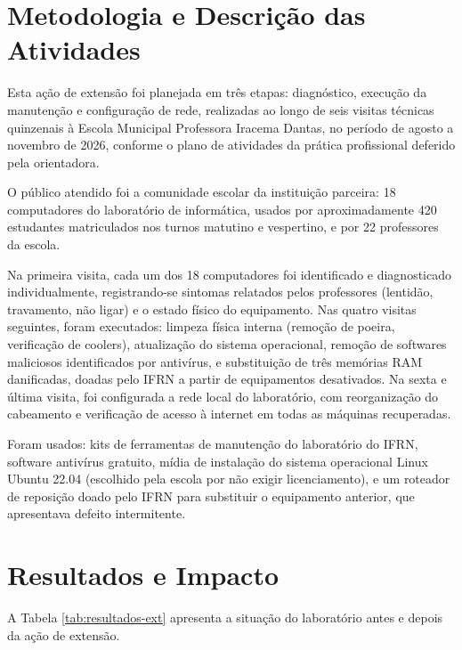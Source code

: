 \documentclass[article,12pt,a4paper,oneside]{abntex2}
\begin{document}
\section{Metodologia e Descrição das Atividades}

Esta ação de extensão foi planejada em três etapas: diagnóstico,
execução da manutenção e configuração de rede, realizadas ao longo de seis
visitas técnicas quinzenais à Escola Municipal Professora Iracema Dantas,
no período de agosto a novembro de 2026, conforme o plano de atividades da
prática profissional deferido pela orientadora.

O público atendido foi a comunidade escolar da instituição parceira: 18
computadores do laboratório de informática, usados por aproximadamente 420
estudantes matriculados nos turnos matutino e vespertino, e por 22
professores da escola.

Na primeira visita, cada um dos 18 computadores foi identificado e
diagnosticado individualmente, registrando-se sintomas relatados pelos
professores (lentidão, travamento, não ligar) e o estado físico do
equipamento. Nas quatro visitas seguintes, foram executados: limpeza
física interna (remoção de poeira, verificação de coolers), atualização
do sistema operacional, remoção de softwares maliciosos identificados por
antivírus, e substituição de três memórias RAM danificadas, doadas pelo
IFRN a partir de equipamentos desativados. Na sexta e última visita, foi
configurada a rede local do laboratório, com reorganização do cabeamento
e verificação de acesso à internet em todas as máquinas recuperadas.

Foram usados: kits de ferramentas de manutenção do laboratório do IFRN,
software antivírus gratuito, mídia de instalação do sistema operacional
Linux Ubuntu 22.04 (escolhido pela escola por não exigir licenciamento), e
um roteador de reposição doado pelo IFRN para substituir o equipamento
anterior, que apresentava defeito intermitente.

\section{Resultados e Impacto}

A Tabela \ref{tab:resultados-ext} apresenta a situação do laboratório
antes e depois da ação de extensão.
\end{document}
